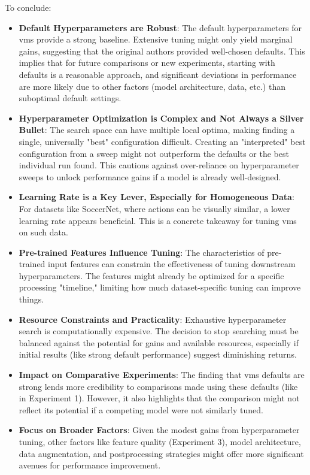 To conclude:
\begin{itemize}
    \item \textbf{Default Hyperparameters are Robust}: The default hyperparameters for \acrshort{vms} provide a strong baseline. Extensive tuning might only yield marginal gains, suggesting that the original authors provided well-chosen defaults. This implies that for future comparisons or new experiments, starting with defaults is a reasonable approach, and significant deviations in performance are more likely due to other factors (model architecture, data, etc.) than suboptimal default settings.
    \item \textbf{Hyperparameter Optimization is Complex and Not Always a Silver Bullet}: The search space can have multiple local optima, making finding a single, universally "best" configuration difficult. Creating an "interpreted" best configuration from a sweep might not outperform the defaults or the best individual run found. This cautions against over-reliance on hyperparameter sweeps to unlock performance gains if a model is already well-designed.
    \item \textbf{Learning Rate is a Key Lever, Especially for Homogeneous Data}: For datasets like SoccerNet, where actions can be visually similar, a lower learning rate appears beneficial. This is a concrete takeaway for tuning \acrshort{vms} on such data.
    \item \textbf{Pre-trained Features Influence Tuning}: The characteristics of pre-trained input features can constrain the effectiveness of tuning downstream hyperparameters. The features might already be optimized for a specific processing "timeline," limiting how much dataset-specific tuning can improve things.
    \item \textbf{Resource Constraints and Practicality}: Exhaustive hyperparameter search is computationally expensive. The decision to stop searching must be balanced against the potential for gains and available resources, especially if initial results (like strong default performance) suggest diminishing returns.
    \item \textbf{Impact on Comparative Experiments}: The finding that \acrshort{vms} defaults are strong lends more credibility to comparisons made using these defaults (like in Experiment 1). However, it also highlights that the comparison might not reflect its potential if a competing model were not similarly tuned.
    \item \textbf{Focus on Broader Factors}: Given the modest gains from hyperparameter tuning, other factors like feature quality (Experiment 3), model architecture, data augmentation, and postprocessing strategies might offer more significant avenues for performance improvement.
\end{itemize}


